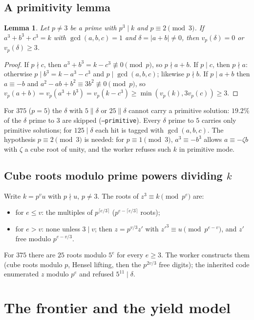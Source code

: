 \documentclass[11pt,a4paper]{article}
\newtheorem{lemma}[proposition]{Lemma}
\theoremstyle{remark}
\begin{document}
\subsection{A primitivity lemma}
\begin{lemma}\label{lem:prim}
Let $p\ne3$ be a prime with $p^3\mid k$ and $p\equiv2\pmod3$. If $a^3+b^3+c^3=k$ with
$\gcd(a,b,c)=1$ and $\delta=|a+b|\ne0$, then $v_p(\delta)=0$ or $v_p(\delta)\ge3$.
\end{lemma}
\begin{proof}
If $p\nmid c$, then $a^3+b^3=k-c^3\not\equiv0\pmod p$, so $p\nmid a+b$. If $p\mid c$, then $p\nmid a$:
otherwise $p\mid b^3=k-a^3-c^3$ and $p\mid\gcd(a,b,c)$; likewise $p\nmid b$. If $p\mid a+b$ then
$a\equiv-b$ and $a^2-ab+b^2\equiv3b^2\not\equiv0\pmod p$, so
$v_p(a+b)=v_p(a^3+b^3)=v_p(k-c^3)\ge\min(v_p(k),3v_p(c))\ge3$.
\end{proof}

For $375$ ($p=5$) the $\delta$ with $5\parallel\delta$ or $25\parallel\delta$ cannot carry a
primitive solution: $19.2\%$ of the $\delta$ prime to $3$ are skipped (\texttt{--primitive}).
Every $\delta$ prime to $5$ carries only primitive solutions; for $125\mid\delta$ each hit is
tagged with $\gcd(a,b,c)$. The hypothesis $p\equiv2\pmod3$ is needed: for $p\equiv1\pmod3$,
$a^3\equiv-b^3$ allows $a\equiv-\zeta b$ with $\zeta$ a cube root of unity, and the worker refuses
such $k$ in primitive mode.

\subsection{Cube roots modulo prime powers dividing $k$}
Write $k=p^vu$ with $p\nmid u$, $p\ne3$. The roots of $z^3\equiv k\pmod{p^e}$ are:
\begin{itemize}[leftmargin=*]
  \item for $e\le v$: the multiples of $p^{\lceil e/3\rceil}$ ($p^{e-\lceil e/3\rceil}$ roots);
  \item for $e>v$: none unless $3\mid v$; then $z=p^{v/3}z'$ with $z'^3\equiv u\pmod{p^{e-v}}$, and $z'$
  free modulo $p^{e-v/3}$.
\end{itemize}
For $375$ there are $25$ roots modulo $5^e$ for every $e\ge3$. The worker constructs them (cube
roots modulo $p$, Hensel lifting, then the $p^{2v/3}$ free digits); the inherited code enumerated
$z$ modulo $p^e$ and refused $5^{11}\mid\delta$.

\section{The frontier and the yield model}\label{sec:model}
\end{document}

